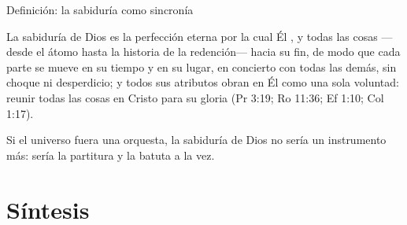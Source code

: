\begin{frame}{Definición: la sabiduría como sincronía}
\begin{tcolorbox}[colback=papiro,colframe=azul,boxrule=1pt,arc=3pt]
\small La sabiduría de Dios es la perfección eterna por la cual Él ,  y  todas las cosas ---desde el átomo hasta la historia de la redención--- hacia su fin, de modo que cada parte se mueve en su tiempo y en su lugar, en concierto con todas las demás, sin choque ni desperdicio; y todos sus atributos obran en Él como una sola voluntad: reunir todas las cosas en Cristo para su gloria (Pr 3:19; Ro 11:36; Ef 1:10; Col 1:17).
\end{tcolorbox}
\centering
{}\par\smallskip
\small Si el universo fuera una orquesta, la sabiduría de Dios no sería un instrumento más: sería la partitura y la batuta a la vez.
\end{frame}

\section{Síntesis}

